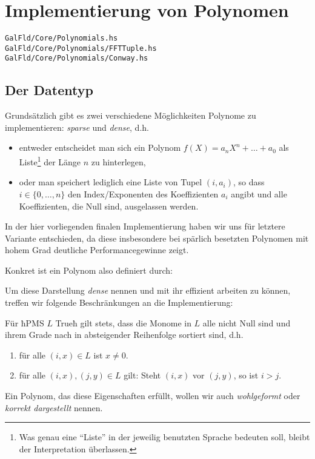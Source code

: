 \section{Implementierung von Polynomen}
\texttt{GalFld/Core/Polynomials.hs}\\
\texttt{GalFld/Core/Polynomials/FFTTuple.hs}\\
\texttt{GalFld/Core/Polynomials/Conway.hs}\\

\subsection{Der Datentyp}

Grundsätzlich gibt es zwei verschiedene Möglichkeiten Polynome zu
implementieren: \emph{sparse} und \emph{dense}, d.h. 
\begin{itemize}
  \item entweder entscheidet man
    sich ein Polynom $f(X) = a_nX^n + \ldots + a_0$ als Liste\footnote{Was genau 
    eine ``Liste'' in der jeweilig benutzten Sprache bedeuten soll, bleibt der
    Interpretation überlassen.} der Länge $n$ zu hinterlegen,
  \item oder man speichert lediglich eine Liste von Tupel $(i,a_i)$, so dass
    $i \in \{0,\ldots,n\}$ den Index/Exponenten des Koeffizienten $a_i$ angibt
    und alle Koeffizienten, die Null sind, ausgelassen werden.
\end{itemize}
In der hier vorliegenden finalen Implementierung haben wir uns für letztere
Variante entschieden, da diese insbesondere bei spärlich besetzten Polynomen
mit hohem Grad deutliche Performancegewinne zeigt.

Konkret ist ein Polynom also definiert durch:

Um diese Darstellung \emph{dense} nennen und mit ihr effizient arbeiten zu 
können, treffen wir folgende Beschränkungen an die Implementierung:
\begin{invariante}
  \label{inv:poly}
  Für ħPMS $L$ Trueħ gilt stets, dass die Monome in $L$ alle nicht Null 
  sind und ihrem Grade nach in
  absteigender Reihenfolge sortiert sind, d.h.
  \begin{enumerate}
    \item für alle $(i,x) \in L$ ist $x \neq 0$.
    \item für alle $(i,x), (j,y) \in L$ gilt: Steht $(i,x)$ vor $(j,y)$, so ist
      $i > j$.
  \end{enumerate}
  Ein Polynom, das diese Eigenschaften erfüllt, wollen wir auch 
  \emph{wohlgeformt} oder \emph{korrekt dargestellt} nennen.
\end{invariante}

